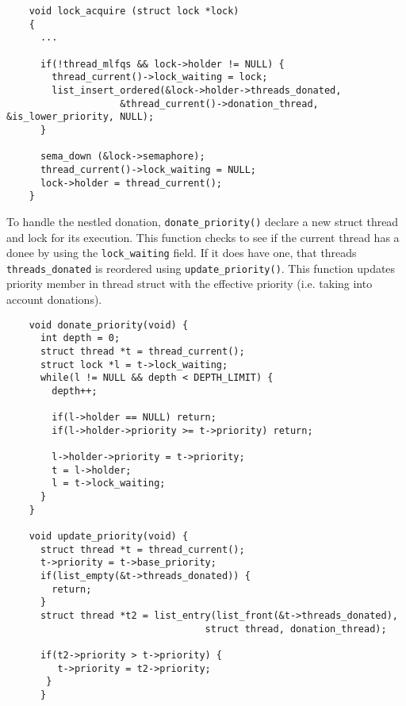 \documentclass{article}
\begin{document}
\begin{lstlisting}
    void lock_acquire (struct lock *lock)
    {
      ...

      if(!thread_mlfqs && lock->holder != NULL) {
        thread_current()->lock_waiting = lock;
        list_insert_ordered(&lock->holder->threads_donated,
                    &thread_current()->donation_thread, &is_lower_priority, NULL);
      }

      sema_down (&lock->semaphore);
      thread_current()->lock_waiting = NULL;
      lock->holder = thread_current();
    }
\end{lstlisting}

To handle the nestled donation, \texttt{donate\_priority()} declare a new struct thread and lock for  its execution. This function checks to see if the current thread has a donee by
using the \texttt{lock\_waiting} field. If it does have one, that threads \texttt{threads\_donated}
is reordered using \texttt{update\_priority()}. This function updates priority member in thread struct with the effective priority (i.e. taking into account donations).

\begin{lstlisting}
    void donate_priority(void) {
      int depth = 0;
      struct thread *t = thread_current();
      struct lock *l = t->lock_waiting;
      while(l != NULL && depth < DEPTH_LIMIT) {
        depth++;

        if(l->holder == NULL) return;
        if(l->holder->priority >= t->priority) return;

        l->holder->priority = t->priority;
        t = l->holder;
        l = t->lock_waiting;
      }
    }

    void update_priority(void) {
      struct thread *t = thread_current();
      t->priority = t->base_priority;
      if(list_empty(&t->threads_donated)) {
        return;
      }
      struct thread *t2 = list_entry(list_front(&t->threads_donated),
                                   struct thread, donation_thread);

      if(t2->priority > t->priority) {
         t->priority = t2->priority;
       }
      }
\end{lstlisting}
\end{document}
